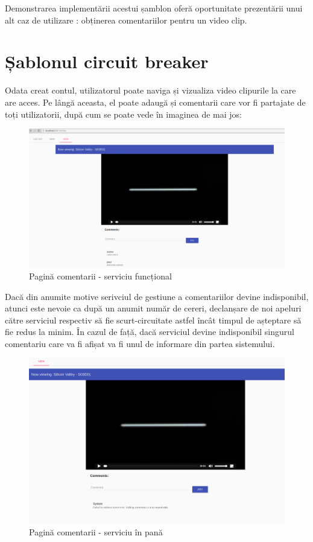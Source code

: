\documentclass[12pt, a4paper, oneside, romanian]{teza-upb}
\begin{document}
Demonstrarea implementării acestui șamblon oferă oportunitate prezentării unui alt caz de utilizare : obținerea comentariilor pentru un video clip.

\newpage
\section{Șablonul circuit breaker}

Odata creat contul, utilizatorul poate naviga și vizualiza video clipurile la care are acces. Pe lângă aceasta, el poate adaugă și comentarii care vor fi partajate de toți utilizatorii, după cum se poate vede în imaginea de mai jos:
\begin{figure}[ht]
\centering
\includegraphics[scale=0.25]{img/comments-working.png}
\caption{Pagină comentarii - serviciu funcțional}
\label{fig:arhi_componente}
\end{figure}

Dacă din anumite motive serivciul de gestiune a comentariilor devine indisponibil, atunci este nevoie ca după un anumit număr de cereri, declanșare de noi apeluri către serviciul respectiv să fie scurt-circuitate astfel încât timpul de așteptare să fie redus la minim. În cazul de față, dacă serviciul devine indisponibil singurul comentariu care va fi afișat va fi unul de informare din partea sistemului. 
\begin{figure}[ht]
\centering
\includegraphics[scale=0.25]{img/comments-not-working.png}
\caption{Pagină comentarii - serviciu în pană}
\label{fig:arhi_componente}
\end{figure}
\end{document}

